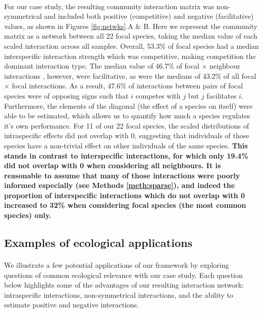 \documentclass[a4,12pt]{article}
\begin{document}
\begin{refsection}
    \paragraph{}
    For our case study, the resulting community interaction matrix was non-symmetrical and included both positive (competitive) and negative (facilitative) values, as shown in Figures \ref{fig:netwks}.A \& B. Here we represent the community matrix as a network between all 22 focal species, taking the median value of each scaled interaction  across all samples. Overall, 53.3\% of focal species had a median interspecific interaction strength which was competitive, making competition the dominant interaction type. The median value of 46.7\% of focal $\times$ neighbour interactions , however, were facilitative, as were the medians of 43.2\% of all focal $\times$ focal interactions. As a result, 47.6\% of interactions between pairs of focal species were of opposing signs such that $i$ competes with $j$ but $j$ facilitates $i$. Furthermore, the elements of the diagonal (the effect of a species on itself) were able to be estimated, which allows us to quantify how much a species regulates it's own performance. For 11 of our 22 focal species, the scaled distributions of intraspecific effects did not overlap with 0, suggesting that individuals of those species have a non-trivial effect on other individuals of the same species. \textbf{This stands in contrast to interspecific interactions, for which only 19.4\% did not overlap with 0 when considering all neighbours. It is reasonable to assume that many of those interactions were poorly informed especially (see Methods \ref{meth:sparse}), and indeed the proportion of interspecific interactions which do not overlap with 0 increased to 32\% when considering focal species (the most common species) only.}

    \subsection{Examples of ecological applications}

    \paragraph{}
    We illustrate a few potential applications of our framework by exploring questions of common ecological relevance with our case study. Each question below highlights some of the advantages of our resulting interaction network: intraspecific interactions, non-symmetrical interactions, and the ability to estimate positive and negative interactions. %



\end{refsection}
\end{document}
